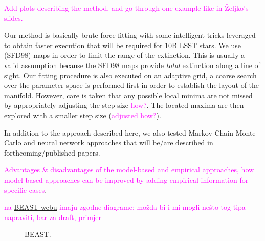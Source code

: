 \documentclass[linenumbers, twocolumn, trackchanges]{aastex631}
\newcommand{\magcom}[1]{\textcolor{magenta}{#1}} %
\newcommand{\RV}{\textit{R\textsubscript{V}}\xspace}
\begin{document}
\magcom{Add plots describing the method, and go through one example like in Željko's slides. }

Our method is basically brute-force fitting with some intelligent tricks leveraged to obtain faster execution that will be required for 10B LSST stars. We use \cite{schlegel_maps_1998} (SFD98) maps in order to limit the range of the extinction. This is usually a valid assumption because the SFD98 maps provide \textit{total} extinction along a line of sight. Our fitting procedure is also executed on an adaptive grid, a coarse search over the parameter space is performed first in order to establish the layout of the manifold. However, care is taken that any possible local minima are not missed by appropriately adjusting the step size \magcom{how?}. The located maxima are then explored with a smaller step size (\magcom{adjusted how?}).

In addition to the approach described here, we also tested Markov Chain Monte Carlo and neural network approaches that will be/are described in forthcoming/published papers.


\magcom{Advantages \& disadvantages of the model-based and empirical approaches, how model based approaches can be improved by adding empirical information for specific cases}.

\magcom{\cite{gordon_panchromatic_2016} na \href{https://beast.readthedocs.io/en/latest/beast\_graphical\_model.html}{BEAST webu} imaju zgodne diagrame; možda bi i mi mogli nešto tog tipa napraviti, bar za draft, primjer }

\begin{figure}[ht!]
	\caption{BEAST. \label{fig:BEAST}}
\end{figure}



\end{document}
